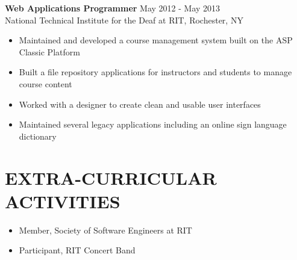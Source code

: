 \documentclass[line,margin]{res}
\begin{document}
\begin{resume}
			   {\bf Web Applications Programmer} \hfill May 2012 - May 2013\\
               National Technical Institute for the Deaf at RIT, 
               Rochester, NY
               
                 \begin{itemize}  \itemsep -2pt %
				  \item Maintained and developed a course management system built on the ASP Classic Platform
                  \item Built a file repository applications for instructors and students to manage course content
                  \item Worked with a designer to create clean and usable user interfaces
                  \item Maintained several legacy applications including an online sign language dictionary
                \end{itemize}
 

   
 
				 \section{EXTRA-CURRICULAR \\ ACTIVITIES}             
				     \begin{itemize}  \itemsep -2pt 
					 	  \item Member, Society of Software Engineers at RIT
				     	\item Participant, RIT Concert Band 
				 	\end{itemize} 
\end{resume}
\end{document}
